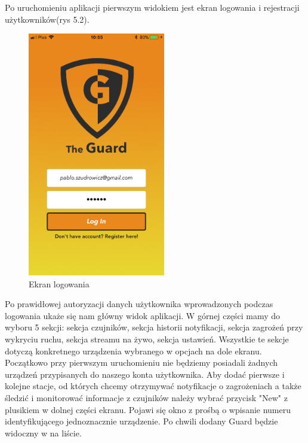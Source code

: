 Po uruchomieniu aplikacji pierwszym widokiem jest ekran logowania i rejestracji użytkowników(rys 5.2).
\begin{figure}[h]
	\centering
	\includegraphics[width=6cm]{login.png}
	\caption{Ekran logowania}
\end{figure}
Po prawidłowej autoryzacji danych użytkownika wprowadzonych podczas logowania ukaże się nam główny widok aplikacji. W górnej części mamy do wyboru 5 sekcji:
sekcja czujników, sekcja historii notyfikacji, sekcja zagrożeń przy wykryciu ruchu, sekcja streamu na żywo, sekcja ustawień. Wszystkie te sekcje dotyczą konkretnego urządzenia wybranego w opcjach na dole ekranu. Początkowo przy pierwszym uruchomieniu nie będziemy posiadali żadnych urządzeń przypisanych do naszego konta użytkownika. Aby dodać pierwsze i kolejne stacje, od których chcemy otrzymywać notyfikacje o zagrożeniach a także śledzić i monitorować informacje z czujników należy wybrać przycisk "New" z plusikiem w dolnej części ekranu. Pojawi się okno z prośbą o wpisanie numeru identyfikującego jednoznacznie urządzenie. Po chwili dodany Guard będzie widoczny w na liście.

